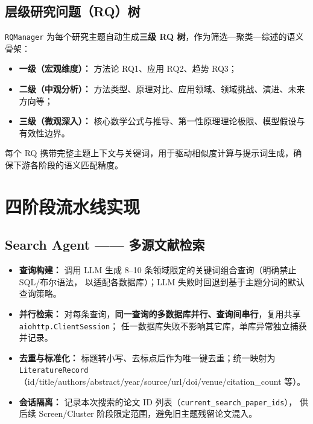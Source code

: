 \documentclass[10pt,a4paper]{article}
\begin{document}
\subsection{层级研究问题（RQ）树}
\texttt{RQManager} 为每个研究主题自动生成\textbf{三级 RQ 树}，作为筛选—聚类—综述的语义骨架：
\begin{itemize}[leftmargin=2.2em,itemsep=0.05em]
  \item \textbf{一级（宏观维度）：} 方法论 RQ1、应用 RQ2、趋势 RQ3；
  \item \textbf{二级（中观分析）：} 方法类型、原理对比、应用领域、领域挑战、演进、未来方向等；
  \item \textbf{三级（微观深入）：} 核心数学公式与推导、第一性原理理论极限、模型假设与有效性边界。
\end{itemize}
每个 RQ 携带完整主题上下文与关键词，用于驱动相似度计算与提示词生成，确保下游各阶段的语义匹配精度。

\section{四阶段流水线实现}

\subsection{Search Agent —— 多源文献检索}
\begin{itemize}[leftmargin=2.2em,itemsep=0.08em]
  \item \textbf{查询构建：} 调用 LLM 生成 8–10 条领域限定的关键词组合查询（明确禁止 SQL/布尔语法，
        以适配各数据库）；LLM 失败时回退到基于主题分词的默认查询策略。
  \item \textbf{并行检索：} 对每条查询，\textbf{同一查询的多数据库并行、查询间串行}，复用共享 \texttt{aiohttp.ClientSession}；
        任一数据库失败不影响其它库，单库异常独立捕获并记录。
  \item \textbf{去重与标准化：} 标题转小写、去标点后作为唯一键去重；统一映射为 \texttt{LiteratureRecord}
        （id/title/authors/abstract/year/source/url/doi/venue/citation\_count 等）。
  \item \textbf{会话隔离：} 记录本次搜索的论文 ID 列表（\texttt{current\_search\_paper\_ids}），
        供后续 Screen/Cluster 阶段限定范围，避免旧主题残留论文混入。
\end{itemize}
\end{document}
